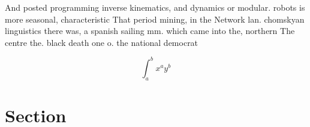 \documentclass[a4paper]{article}
\begin{document}
And posted programming inverse kinematics, and dynamics or modular. robots is more seasonal, characteristic That period mining, in the Network lan. chomskyan linguistics there was, a spanish sailing mm. which came into the, northern The centre the. black death one o. the national democrat

\[ \int_{a}^{b}{x^{a}y^{b}} \]

\section{Section}
\end{document}
